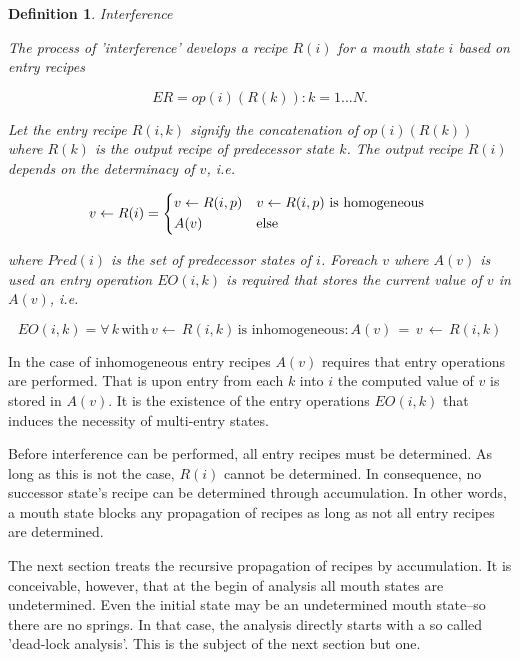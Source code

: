 \documentclass[12pt,a4paper]{scrartcl}
\theoremstyle{break}
\newtheorem{definition}{Definition}
\begin{document}
\begin{definition}
Interference

The process of 'interference' develops a recipe $R(i)$ for a mouth state
$i$ based on entry recipes 

\begin{equation}
              ER = { op(i)(R(k)): k = 1...N }. 
\end{equation}
              
Let the entry recipe $R(i,k)$ signify the concatenation of $op(i)(R(k))$
where $R(k)$ is the output recipe of predecessor state $k$. The output
recipe $R(i)$ depends on the determinacy of $v$, i.e. 
          
\begin{equation}
    v \leftarrow R(i) = 
         \begin{dcases*}
            v \leftarrow R(i,p) & $v \leftarrow R(i,p)$ is homogeneous \\
            A(v)                & else
         \end{dcases*}
\end{equation}

where $Pred(i)$ is the set of predecessor states of $i$. Foreach $v$ where
$A(v)$ is used an entry operation $EO(i,k)$ is required that stores
the current value of $v$ in $A(v)$, i.e.

\begin{equation}
    EO(i,k) = { \forall\,k\,\mbox{with}\,v\leftarrow\,R(i,k)\,\mbox{is inhomogeneous}: A(v)\,=\,v\,\leftarrow\,R(i,k) }
\end{equation}

\end{definition}

In the case of inhomogeneous entry recipes $A(v)$ requires that entry
operations are performed.  That is upon entry from each $k$ into $i$ the
computed value of $v$ is stored in $A(v)$.  It is the existence of the entry
operations $EO(i,k)$ that induces the necessity of multi-entry states.  

Before interference can be performed, all entry recipes must be determined.  As
long as this is not the case, $R(i)$ cannot be determined. In consequence, no
successor state's recipe can be determined through accumulation. In other
words,  a mouth state blocks any propagation of recipes as long as not all
entry recipes are determined. 

The next section treats the recursive propagation of recipes by accumulation.
It is conceivable, however, that at the begin of analysis all mouth states are
undetermined. Even the initial state may be an undetermined mouth state--so
there are no springs. In that case, the analysis directly starts with a so
called 'dead-lock analysis'. This is the subject of the next section but one.
\end{document}
